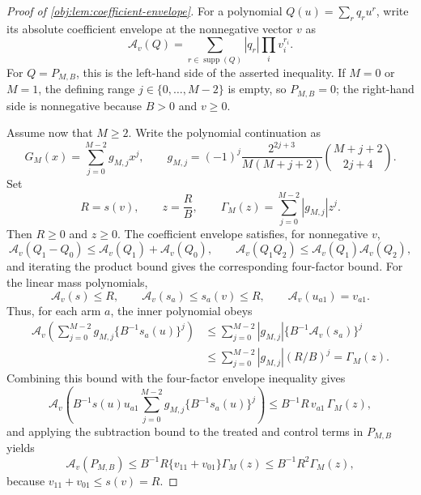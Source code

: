 \begin{proof}[Proof of \cref{obj:lem:coefficient-envelope}]
For a polynomial \(Q(u)=\sum_r q_ru^r\), write its absolute coefficient envelope at the nonnegative vector \(v\) as
\[
\mathcal A_v(Q)=\sum_{r\in\operatorname{supp}(Q)}|q_r|\prod_i v_i^{r_i}.
\]
For \(Q=P_{M,B}\), this is the left-hand side of the asserted inequality. If \(M=0\) or \(M=1\), the defining range \(j\in\{0,\ldots,M-2\}\) is empty, so \(P_{M,B}=0\); the right-hand side is nonnegative because \(B>0\) and \(v\ge0\). %

Assume now that \(M\ge2\). Write the polynomial continuation as
\[
G_M(x)=\sum_{j=0}^{M-2}g_{M,j}x^j,
\qquad
 g_{M,j}=(-1)^j\frac{2^{2j+3}}{M(M+j+2)}{M+j+2\choose 2j+4}.
\]
Set
\[
R=s(v),\qquad z=\frac RB,
\qquad
\Gamma_M(z)=\sum_{j=0}^{M-2}|g_{M,j}|z^j.
\]
Then \(R\ge0\) and \(z\ge0\). The coefficient envelope satisfies, for nonnegative \(v\),
\[
\mathcal A_v(Q_1-Q_0)\le \mathcal A_v(Q_1)+\mathcal A_v(Q_0),
\qquad
\mathcal A_v(Q_1Q_2)\le \mathcal A_v(Q_1)\mathcal A_v(Q_2),
\]
and iterating the product bound gives the corresponding four-factor bound. %
For the linear mass polynomials,
\[
\mathcal A_v(s)\le R,
\qquad
\mathcal A_v(s_a)\le s_a(v)\le R,
\qquad
\mathcal A_v(u_{a1})=v_{a1}.
\] %
Thus, for each arm \(a\), the inner polynomial obeys
\[
\begin{aligned}
\mathcal A_v\!\left(\sum_{j=0}^{M-2}g_{M,j}\{B^{-1}s_a(u)\}^j\right)
&\le \sum_{j=0}^{M-2}|g_{M,j}|
       \{B^{-1}\mathcal A_v(s_a)\}^j  \\
&\le \sum_{j=0}^{M-2}|g_{M,j}|(R/B)^j
=\Gamma_M(z).
\end{aligned}
\] %
Combining this bound with the four-factor envelope inequality gives
\[
\mathcal A_v\!\left(
B^{-1}s(u)u_{a1}
\sum_{j=0}^{M-2}g_{M,j}\{B^{-1}s_a(u)\}^j
\right)
\le
B^{-1}R\,v_{a1}\,\Gamma_M(z),
\] %
and applying the subtraction bound to the treated and control terms in \(P_{M,B}\) yields
\[
\mathcal A_v(P_{M,B})
\le
B^{-1}R\{v_{11}+v_{01}\}\Gamma_M(z)
\le
B^{-1}R^2\Gamma_M(z),
\]
because \(v_{11}+v_{01}\le s(v)=R\). %


\end{proof}
